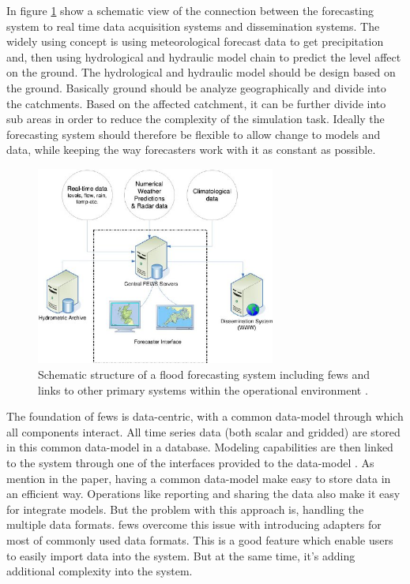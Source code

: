 In figure \ref{fi:fews_schematic} show a schematic view of the connection between the forecasting system to real time data acquisition systems and dissemination systems. The widely using concept is using meteorological forecast data to get precipitation and, then using hydrological and hydraulic model chain to predict the level affect on the ground. The hydrological and hydraulic model should be design based on the ground. Basically ground should be analyze geographically and divide into the catchments. Based on the affected catchment, it can be further divide into sub areas in order to reduce the complexity of the simulation task. Ideally the forecasting system should therefore be flexible to allow change to models and data, while keeping the way forecasters work with it as constant as possible.
 
\begin{figure}[htp]
    \centering
    \includegraphics[width=0.7\textwidth]{fews/Schematic-structure-of-a-fl-ood-forecasting-system-showing-the-position-of-Delft-FEWS_W640.jpg}
    \caption[Schematic structure of a flood forecasting system including \acrshort{fews} and links to other primary systems within the operational environment]{Schematic structure of a flood forecasting system including \acrshort{fews} and links to other primary systems within the operational environment \cite{Werner2013TheSystem}.}
    \label{fi:fews_schematic}
\end{figure}

The foundation of \acrshort{fews} is data-centric, with a common data-model through which all components interact. All time series data (both scalar and gridded) are stored in this common data-model in a database. Modeling capabilities are then linked to the system through one of the interfaces provided to the data-model \cite{Werner2013TheSystem}. As mention in the paper, having a common data-model make easy to store data in an efficient way. Operations like reporting and sharing the data also make it easy for integrate models. But the problem with this approach is, handling the multiple data formats. \acrshort{fews} overcome this issue with introducing adapters for most of commonly used data formats. This is a good feature which enable users to easily import data into the system. But at the same time, it's adding additional complexity into the system.

